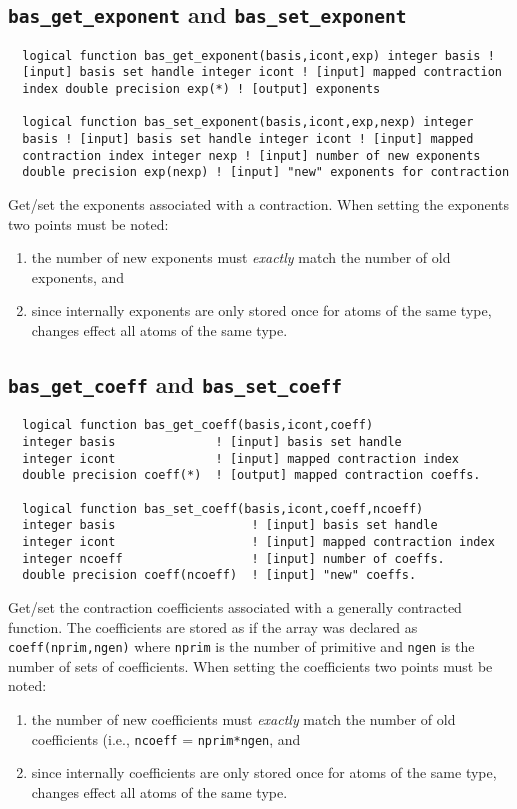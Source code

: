 \subsection{{\tt bas\_get\_exponent} and {\tt bas\_set\_exponent}}
\begin{verbatim}
  logical function bas_get_exponent(basis,icont,exp) integer basis !
  [input] basis set handle integer icont ! [input] mapped contraction
  index double precision exp(*) ! [output] exponents

  logical function bas_set_exponent(basis,icont,exp,nexp) integer
  basis ! [input] basis set handle integer icont ! [input] mapped
  contraction index integer nexp ! [input] number of new exponents
  double precision exp(nexp) ! [input] "new" exponents for contraction
\end{verbatim}
Get/set the exponents associated with a contraction.  When setting the
exponents two points must be noted:
\begin{enumerate}
\item the number of new exponents must {\em exactly} match the number
  of old exponents, and
\item since internally exponents are only stored once for atoms of the
  same type, changes effect all atoms of the same type.
\end{enumerate}

\subsection{{\tt bas\_get\_coeff} and {\tt bas\_set\_coeff}}
\begin{verbatim}
  logical function bas_get_coeff(basis,icont,coeff)
  integer basis              ! [input] basis set handle
  integer icont              ! [input] mapped contraction index
  double precision coeff(*)  ! [output] mapped contraction coeffs.

  logical function bas_set_coeff(basis,icont,coeff,ncoeff)
  integer basis                   ! [input] basis set handle                   
  integer icont                   ! [input] mapped contraction index           
  integer ncoeff                  ! [input] number of coeffs.
  double precision coeff(ncoeff)  ! [input] "new" coeffs. 
\end{verbatim}
Get/set the contraction coefficients associated with a generally
contracted function.  The coefficients are stored as if the array was
declared as {\tt coeff(nprim,ngen)} where {\tt nprim} is the number of
primitive and {\tt ngen} is the number of sets of coefficients.  When
setting the coefficients two points must be noted:
\begin{enumerate}
\item the number of new coefficients must {\em exactly} match the
  number of old coefficients (i.e., {\tt ncoeff} = {\tt nprim*ngen}, and
\item since internally coefficients are only stored once for atoms of the
  same type, changes effect all atoms of the same type.
\end{enumerate}


